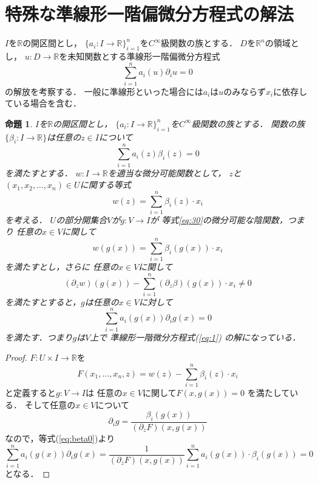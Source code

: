 \documentclass[leqno, a4paper, 12pt]{jsarticle}
\newtheorem{prop}[thm]{命題}
\newcommand{\rr}{\mathbb{R}}
\begin{document}
\section{特殊な準線形一階偏微分方程式の解法}
$I$を$\rr$の開区間とし，
$\{a_i:I\to \rr\}_{i=1}^n$を$C^{\infty}$級関数の族とする．
$D$を$\rr^n$の領域とし，
$u:D\to \rr$を未知関数とする準線形一階偏微分方程式
\begin{equation}\label{eq:1}
\sum_{i=1}^na_i(u)\partial_{i}u=0 
\end{equation}
の解放を考察する．
一般に準線形といった場合には$a_i$は$u$のみならず$x_i$に依存している場合を含む．
\begin{prop}
$I$を$\rr$の開区間とし，
$\{a_i:I\to \rr\}_{i=1}^n$を$C^{\infty}$級関数の族とする．
関数の族
$\{\beta_i: I\to \rr\}$は任意の$z\in I$について
\begin{equation}\label{eq:beta0}
\sum_{i=1}^na_i(z)\beta_i(z)=0 
\end{equation}
を満たすとする．
$w: I\to \rr$を適当な微分可能関数として，
$z$と$(x_1, x_2, \dots, x_n)\in U$に関する等式
\begin{equation}\label{eq:30}
w(z)=\sum_{i=1}^n\beta_i(z)\cdot x_i
\end{equation}
を考える．
$U$の部分開集合$V$が$g: V\to I$が
等式\ref{eq:30}の微分可能な陰関数，つまり
任意の$x\in V$に関して
\[
w(g(x))=\sum_{i=1}^n\beta_i(g(x))\cdot x_i
\]
を満たすとし，さらに
任意の$x\in V$に関して
\[
(\partial_zw)(g(x))-\sum_{i=1}^n(\partial_z\beta)(g(x))\cdot x_i\neq 0
\]
を満たすとすると，$g$は任意の$x\in V$に対して
\[
\sum_{i=1}^na_i(g(x))\partial_{i}g(x)=0 
\]
を満たす．つまり$g$は$V$上で
準線形一階微分方程式(\ref{eq:1})
の解になっている．
\end{prop}
\begin{proof}
$F: U\times I\to \rr$を
\[
F(x_1, \dots, x_n, z)=w(z)-\sum_{i=1}^n\beta_i(z)\cdot x_i
\]
と定義すると$g: V\to I$は
任意の$x\in V$に関して$F(x, g(x))=0$
を満たしている．
そして任意の$x\in V$について
\[
\partial_ig=\frac{\beta_i(g(x))}{(\partial_zF)(x, g(x))}
\]
なので，等式(\ref{eq:beta0})より
\[
\sum_{i=1}^na_i(g(x))\partial_{i}g(x)=
\frac{1}{(\partial_zF)(x, g(x))}\sum_{i=1}^n a_i(g(x))\cdot \beta_i(g(x))=
0
\]
となる．

\end{proof}
\end{document}
